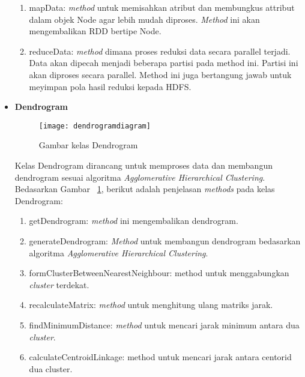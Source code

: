 \begin{itemize}
\begin{enumerate}
\item mapData: \textit{method} untuk memisahkan atribut dan membungkus attribut dalam objek Node agar lebih mudah diproses. \textit{Method} ini akan mengembalikan RDD bertipe Node.  

\item  reduceData: \textit{method} dimana proses reduksi data secara parallel terjadi. Data akan dipecah menjadi beberapa partisi pada method ini. Partisi ini akan diproses secara parallel. Method ini juga bertangung jawab untuk meyimpan pola hasil reduksi kepada HDFS.\\

\end{enumerate}


\item \textbf{Dendrogram}\\

\begin{figure}[H]
    \centering  
    \texttt{[image: dendrogramdiagram]}  
    \caption[Gambar kelas Dendrogram]{Gambar kelas Dendrogram} 
    \label{fig:dendrogramdiagram} 
\end{figure}

Kelas Dendrogram dirancang untuk memproses data dan membangun dendrogram sesuai algoritma \textit{Agglomerative Hierarchical Clustering}. Bedasarkan Gambar ~\ref{fig:dendrogramdiagram}, berikut adalah penjelasan \textit{methods} pada kelas Dendrogram:

\begin{enumerate}
\item getDendrogram: \textit{method} ini mengembalikan dendrogram.

\item generateDendrogram: \textit{Method} untuk membangun dendrogram bedasarkan algoritma \textit{Agglomerative Hierarchical Clustering}. 

\item formClusterBetweenNearestNeighbour: method untuk menggabungkan \textit{cluster} terdekat.

\item recalculateMatrix: \textit{method} untuk menghitung ulang matriks jarak.

\item findMinimumDistance: \textit{method} untuk mencari jarak minimum antara dua \textit{cluster}.

\item calculateCentroidLinkage: method untuk mencari jarak antara centorid dua cluster.


\end{enumerate}
\end{itemize}
